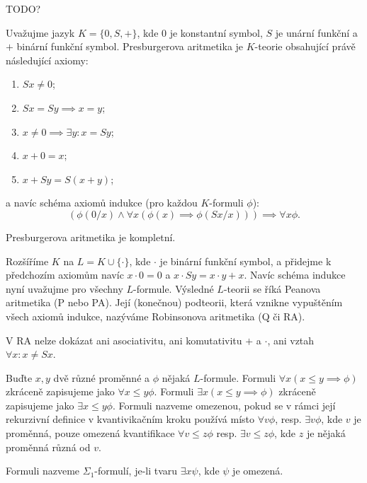 \documentclass[12pt]{article}                   %
\begin{document}
    TODO?


    \begin{definice}
        Uvažujme jazyk $K = \{0, S, +\}$, kde $0$ je konstantní symbol, $S$ je unární funkční a $+$ binární funkční symbol. Presburgerova aritmetika je $K$-teorie obsahující právě následující axiomy:
        
        \begin{enumerate}
            \item $Sx ≠ 0$;
            \item $Sx = Sy \implies x = y$;
            \item $x ≠ 0 \implies \exists y: x = Sy$;
            \item $x + 0 = x$;
            \item $x + Sy = S(x+y)$;
        \end{enumerate}
        
        a navíc schéma axiomů indukce (pro každou $K$-formuli $\phi$):
        $$ (\phi(0/x) \land \forall x (\phi(x) \implies \phi(Sx/x))) \implies \forall x \phi. $$ 
    \end{definice}

    \begin{veta}
        Presburgerova aritmetika je kompletní.
    \end{veta}

    \begin{definice}
        Rozšíříme $K$ na $L = K \cup \{·\}$, kde $·$ je binární funkční symbol, a přidejme k předchozím axiomům navíc $x·0 = 0$ a $x·Sy = x·y + x$. Navíc schéma indukce nyní uvažujme pro všechny $L$-formule. Výsledné $L$-teorii se říká Peanova aritmetika (P nebo PA). Její (konečnou) podteorii, která vznikne vypuštěním všech axiomů indukce, nazýváme Robinsonova aritmetika (Q či RA).
    \end{definice}

    \begin{poznamka}
        V RA nelze dokázat ani asociativitu, ani komutativitu $+$ a $·$, ani vztah $\forall x: x ≠ Sx$.
    \end{poznamka}

    \begin{definice}
        Buďte $x, y$ dvě různé proměnné a $\phi$ nějaká $L$-formule. Formuli $\forall x(x≤y \implies \phi)$ zkráceně zapisujeme jako $\forall x ≤ y \phi$. Formuli $\exists x(x≤y \implies \phi)$ zkráceně zapisujeme jako $\exists x ≤ y \phi$. Formuli nazveme omezenou, pokud se v rámci její rekurzivní definice v kvantivikačním kroku používá místo $\forall v \phi$, resp. $\exists v \phi$, kde $v$ je proměnná, pouze omezená kvantifikace $\forall v ≤ z\phi$ resp. $\exists v ≤ z\phi$, kde $z$ je nějaká proměnná různá od $v$.

        Formuli nazveme $\Sigma_1$-formulí, je-li tvaru $\exists x \psi$, kde $\psi$ je omezená.
    \end{definice}
\end{document}
